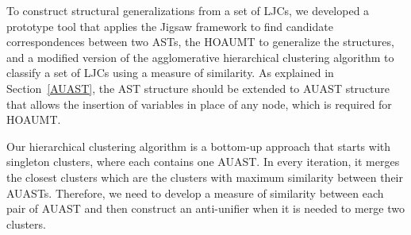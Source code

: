 
To construct structural generalizations from a set of LJCs, we developed a prototype tool that applies the Jigsaw framework to find candidate correspondences between two ASTs, the HOAUMT to generalize the structures, and a modified version of the agglomerative hierarchical clustering algorithm to classify a set of LJCs using a measure of similarity. As explained in Section~\ref{AUAST}, the AST structure should be extended to AUAST structure that allows the insertion of variables in place of any node, which is required for HOAUMT. 


Our hierarchical clustering algorithm is a bottom-up approach that starts with singleton clusters, where each contains one AUAST. In every iteration, it merges the closest clusters which are the clusters with maximum similarity between their AUASTs. Therefore, we need to develop a measure of similarity between each pair of AUAST and then construct an anti-unifier when it is needed to merge two clusters. 

